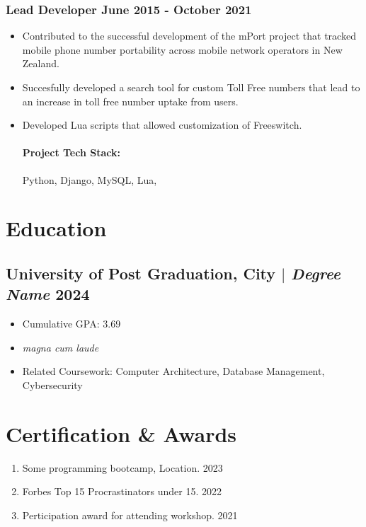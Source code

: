 \documentclass[11pt]{article} %
\begin{document}
\subsubsection{Lead Developer \hfill  June 2015 - October 2021}
\begin{itemize}
    \item Contributed to the successful development of the mPort project that tracked mobile phone number portability across mobile network operators in New Zealand.
    \item Succesfully developed a search tool for custom Toll Free numbers that lead to an increase in toll free number uptake from users.
    \item Developed Lua scripts that allowed customization of Freeswitch. 

    \paragraph{Project Tech Stack:} Python, Django, MySQL, Lua,
\end{itemize}

\section{Education}
\subsection{University of Post Graduation, City $|$ {\normalfont\itshape Degree Name} \hfill 2024}
\begin{itemize}
        \item Cumulative GPA: 3.69
        \item \textit{magna cum laude} 
  \item Related Coursework: Computer Architecture, Database Management, Cybersecurity
\end{itemize}


\section{Certification \& Awards}
\begin{enumerate}[label=\null, left=0pt..0pt, itemsep=0pt]
        \item Some programming bootcamp, Location. \hfill 2023
        \item Forbes Top 15 Procrastinators under 15. \hfill 2022
        \item Perticipation award for attending workshop. \hfill 2021
\end{enumerate}
\end{document}

